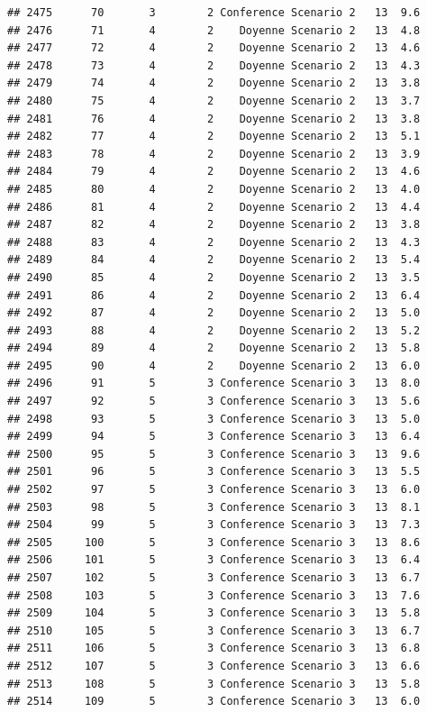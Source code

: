 \documentclass[
]{article}
\begin{document}
\begin{verbatim}
## 2475      70       3        2 Conference Scenario 2   13  9.6
## 2476      71       4        2    Doyenne Scenario 2   13  4.8
## 2477      72       4        2    Doyenne Scenario 2   13  4.6
## 2478      73       4        2    Doyenne Scenario 2   13  4.3
## 2479      74       4        2    Doyenne Scenario 2   13  3.8
## 2480      75       4        2    Doyenne Scenario 2   13  3.7
## 2481      76       4        2    Doyenne Scenario 2   13  3.8
## 2482      77       4        2    Doyenne Scenario 2   13  5.1
## 2483      78       4        2    Doyenne Scenario 2   13  3.9
## 2484      79       4        2    Doyenne Scenario 2   13  4.6
## 2485      80       4        2    Doyenne Scenario 2   13  4.0
## 2486      81       4        2    Doyenne Scenario 2   13  4.4
## 2487      82       4        2    Doyenne Scenario 2   13  3.8
## 2488      83       4        2    Doyenne Scenario 2   13  4.3
## 2489      84       4        2    Doyenne Scenario 2   13  5.4
## 2490      85       4        2    Doyenne Scenario 2   13  3.5
## 2491      86       4        2    Doyenne Scenario 2   13  6.4
## 2492      87       4        2    Doyenne Scenario 2   13  5.0
## 2493      88       4        2    Doyenne Scenario 2   13  5.2
## 2494      89       4        2    Doyenne Scenario 2   13  5.8
## 2495      90       4        2    Doyenne Scenario 2   13  6.0
## 2496      91       5        3 Conference Scenario 3   13  8.0
## 2497      92       5        3 Conference Scenario 3   13  5.6
## 2498      93       5        3 Conference Scenario 3   13  5.0
## 2499      94       5        3 Conference Scenario 3   13  6.4
## 2500      95       5        3 Conference Scenario 3   13  9.6
## 2501      96       5        3 Conference Scenario 3   13  5.5
## 2502      97       5        3 Conference Scenario 3   13  6.0
## 2503      98       5        3 Conference Scenario 3   13  8.1
## 2504      99       5        3 Conference Scenario 3   13  7.3
## 2505     100       5        3 Conference Scenario 3   13  8.6
## 2506     101       5        3 Conference Scenario 3   13  6.4
## 2507     102       5        3 Conference Scenario 3   13  6.7
## 2508     103       5        3 Conference Scenario 3   13  7.6
## 2509     104       5        3 Conference Scenario 3   13  5.8
## 2510     105       5        3 Conference Scenario 3   13  6.7
## 2511     106       5        3 Conference Scenario 3   13  6.8
## 2512     107       5        3 Conference Scenario 3   13  6.6
## 2513     108       5        3 Conference Scenario 3   13  5.8
## 2514     109       5        3 Conference Scenario 3   13  6.0

\end{verbatim}
\end{document}
